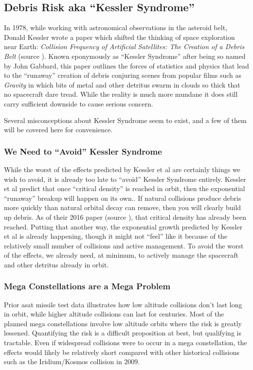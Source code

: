 \subsection{Debris Risk aka ``Kessler Syndrome''}

In 1978, while working with astronomical observations in the asteroid
belt, Donald Kessler wrote a paper which shifted the thinking of space
exploration near Earth: {\it Collision Frequency of Artificial
  Satellites: The Creation of a Debris Belt} (source
\cite{kessler-og}). Known eponymously as ``Kessler Syndrome'' after
being so named by John Gabbard, this paper outlines the forces of
statistics and physics that lead to the ``runaway'' creation of debris
conjuring scenes from popular films such as {\it Gravity} in which
bits of metal and other detritus swarm in clouds so thick that no
spacecraft dare tread.  While the reality is much more mundane it does
still carry sufficient downside to cause serious concern.

Several misconceptions about Kessler Syndrome seem to exist, and a few
of them will be covered here for convenience.

\subsubsection{We Need to ``Avoid'' Kessler Syndrome}
While the worst of the effects predicted by Kessler et al are
certainly things we wish to avoid, it is already too late to ``avoid''
Kessler Syndrome entirely.  Kessler et al predict that once ``critical
density'' is reached in orbit, then the exponential ``runaway''
breakup will happen on its own.\cite[p14]{kessler-reunion}.  If
natural collisions produce debris more quickly than natural orbital
decay can remove, then you will clearly build up debris.  As of their
2016 paper (source \cite{kessler-reunion}), that critical density has
already been reached.\cite[p10]{kessler-reunion} Putting that another
way, the exponential growth predicted by Kessler et al is already
happening, though it might not ``feel'' like it because of the
relatively small number of collisions and active
management.\cite[p14]{kessler-reunion} To avoid the worst of the
effects, we already need, at minimum, to actively manage the
spacecraft and other detritus already in
orbit.\cite[p14]{kessler-reunion}

\subsubsection{Mega Constellations are a Mega Problem}
Prior \ac{asat} missile test data illustrates how low altitude
collisions don't last long in orbit\cite[shakti analysis
  overview]{xxx}, while higher altitude collisions can last for
centuries.\cite[umm...]{xxx} Most of the planned mega constellations
involve low altitude orbits where the risk is greatly
lessened.\cite[cite my own work maybe?]{xxx} Quantifying the risk is a
difficult proposition at best, but qualifying is tractable.  Even if
widespread collisions were to occur in a mega constellation, the
effects would likely be relatively short compared with other
historical collisions such as the Iridium/Kosmos collision in
2009.\cite[my own youtube video maybe?]{xxx}

